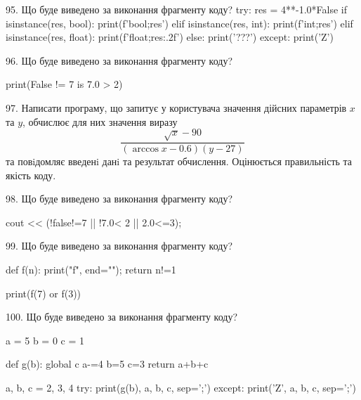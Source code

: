 \documentclass[11pt]{article}
\begin{document}
95. Що буде виведено за виконання фрагменту коду?
try:
    res = 4**-1.0*False
    if isinstance(res, bool):
        print(f'bool;{res}')
    elif isinstance(res, int):
        print(f'int;{res}')
    elif isinstance(res, float):
        print(f'float;{res:.2f}')
    else:
        print('???')
except:
    print('Z')
\vspace{5mm}

96. Що буде виведено за виконання фрагменту коду?

print(False != 7 is 7.0 > 2)
\vspace{5mm}

97. 
Написати програму, що запитує у користувача значення дійсних параметрів $x$ та $y$, обчислює для них значення виразу 
$$\frac{\sqrt x - 90}{(\arccos x - 0.6) (y - 27)}$$ 
та повiдомляє введенi данi та результат обчислення.
 Оцінюється правильність та якість коду.

\vspace{5mm}

98. Що буде виведено за виконання фрагменту коду?

cout << (!false!=7 || !7.0< 2 || 2.0<=3);
\vspace{5mm}

99. Що буде виведено за виконання фрагменту коду?

def f(n):
    print("f", end="");
    return n!=1

print(f(7) or f(3))
\vspace{5mm}

100. Що буде виведено за виконання фрагменту коду?

a = 5
b = 0
c = 1

def g(b):
global c    a-=4
    b=5
    c=3
    return a+b+c

a, b, c = 2, 3, 4
try:
    print(g(b), a, b, c, sep=';')
except:
    print('Z', a, b, c, sep=';')
\vspace{5mm}

\newpage
\end{document}
